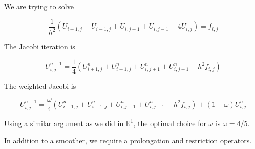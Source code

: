 We are trying to solve

\begin{equation*}
  \frac{1}{h^2}\left(
    U_{i+1, j} + U_{i-1, j} + U_{i, j+1} + U_{i, j-1} - 4U_{i, j}
  \right)
   = f_{i,j}
\end{equation*}

The Jacobi iteration is

\begin{equation*}
    U_{i, j}^{n+1} =
    \frac{1}{4}\left(
    U_{i+1, j}^{n} + U_{i-1, j}^{n} + U_{i, j+1}^{n} + U_{i, j-1}^{n} -  h^2 f_{i,j}
      \right)
\end{equation*}

The weighted Jacobi is

\begin{equation*}
    U_{i, j}^{n+1} =
    \frac{\omega}{4}\left(
    U_{i+1, j}^{n} + U_{i-1, j}^{n} + U_{i, j+1}^{n} + U_{i, j-1}^{n} -  h^2 f_{i,j}
      \right) + (1-\omega)U_{i, j}^{n}
\end{equation*}

Using a similar argument as we did in $\mathbb{R}^1$, the optimal choice for
$\omega$ is $\omega=4/5$.


In addition to a smoother, we require a prolongation and restriction operators.

\begin{center}
    
\end{center}
